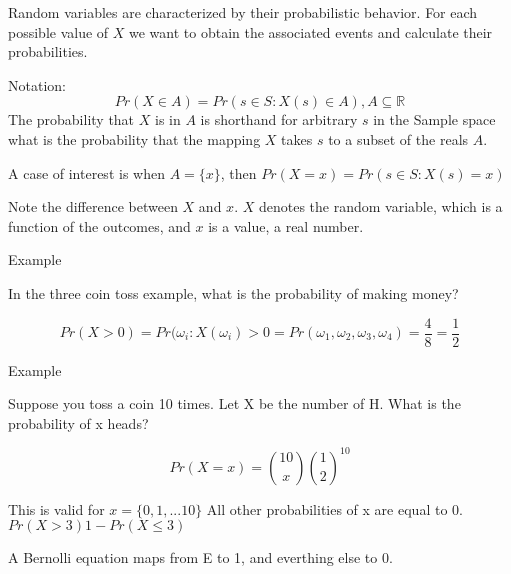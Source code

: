 \documentclass{report}
\begin{document}
\begin{description}
\begin{mdframed}
            Random variables are characterized by their probabilistic
            behavior. For each possible value of  $X$ we want to obtain
            the associated events and calculate their probabilities.

            \vspace{10}

            Notation: 
            \begin{displaymath}
                Pr(X \in A) = Pr(s \in S : X(s) \in A), A \subseteq \mathbb{R}
            \end{displaymath}
            The probability that $X$ is in $A$ is shorthand
            for arbitrary $s$ in the Sample space what is the
            probability that the mapping $X$ takes $s$
            to a subset of the reals $A$.

            A case of interest is when  $A = \{x\}$, then
            $Pr(X = x) = Pr(s \in S : X(s) = x)$

            Note the difference between  $X$ and $x$.
            $X$ denotes the random variable, which
            is a function of the outcomes, and $x$
            is a value, a real number.
        \end{mdframed}
    \item {\large Example}
        \begin{mdframed}
            In the three coin toss example, what is the probability
            of making money?

            \begin{displaymath}
                Pr(X>0) = Pr(\omega_i : X(\omega_i) > 0 = Pr({\omega_1, \omega_2, \omega_3, \omega_4}) = \frac{4}{8} = \frac{1}{2}
            \end{displaymath}
        \end{mdframed}
    \item {\large Example}
        \begin{mdframed}
            Suppose you toss a coin 10 times. Let X be the
            number of H. What is the probability of x heads?

            \begin{displaymath}
                Pr(X=x) = \binom{10}{x} \binom{1}{2}^{10}
            \end{displaymath}

            This is valid for $x = \{0, 1, ... 10\}$ All other
            probabilities of x are equal to 0.  $Pr(X > 3) 1 -
            Pr(X \le 3)$

            A Bernolli equation maps from E to 1, and everthing
            else to 0.
            
        \end{mdframed}
\end{description}
\end{document}
